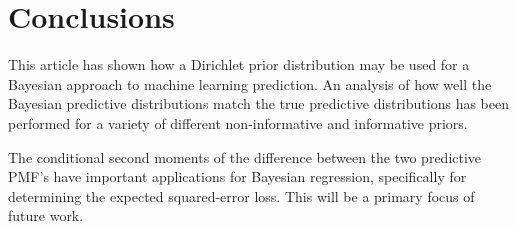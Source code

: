 \documentclass[conference]{IEEEtran}
\begin{document}
\section{Conclusions}

This article has shown how a Dirichlet prior distribution may be used for a Bayesian approach to machine learning prediction. An analysis of how well the Bayesian predictive distributions match the true predictive distributions has been performed for a variety of different non-informative and informative priors.

The conditional second moments of the difference between the two predictive PMF's have important applications for Bayesian regression, specifically for determining the expected squared-error loss. This will be a primary focus of future work.





%

\end{document}
